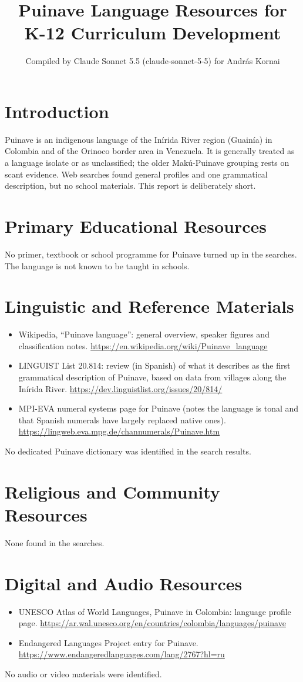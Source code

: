\documentclass[12pt]{article}
\title{Puinave Language Resources for K-12 Curriculum Development}
\author{Compiled by Claude Sonnet 5.5 (claude-sonnet-5-5) for Andr\'as Kornai}
\date{}
\begin{document}
\maketitle

\section{Introduction}
Puinave is an indigenous language of the Inírida River region (Guain\'ia) in Colombia and of the Orinoco border area in Venezuela. It is generally treated as a language isolate or as unclassified; the older Mak\'u-Puinave grouping rests on scant evidence. Web searches found general profiles and one grammatical description, but no school materials. This report is deliberately short.

\section{Primary Educational Resources}
No primer, textbook or school programme for Puinave turned up in the searches. The language is not known to be taught in schools.

\section{Linguistic and Reference Materials}
\begin{itemize}
\item Wikipedia, ``Puinave language'': general overview, speaker figures and classification notes. \url{https://en.wikipedia.org/wiki/Puinave_language}
\item LINGUIST List 20.814: review (in Spanish) of what it describes as the first grammatical description of Puinave, based on data from villages along the Inírida River. \url{https://dev.linguistlist.org/issues/20/814/}
\item MPI-EVA numeral systems page for Puinave (notes the language is tonal and that Spanish numerals have largely replaced native ones). \url{https://lingweb.eva.mpg.de/channumerals/Puinave.htm}
\end{itemize}
No dedicated Puinave dictionary was identified in the search results.

\section{Religious and Community Resources}
None found in the searches.

\section{Digital and Audio Resources}
\begin{itemize}
\item UNESCO Atlas of World Languages, Puinave in Colombia: language profile page. \url{https://ar.wal.unesco.org/en/countries/colombia/languages/puinave}
\item Endangered Languages Project entry for Puinave. \url{https://www.endangeredlanguages.com/lang/2767?hl=ru}
\end{itemize}
No audio or video materials were identified.
\end{document}
